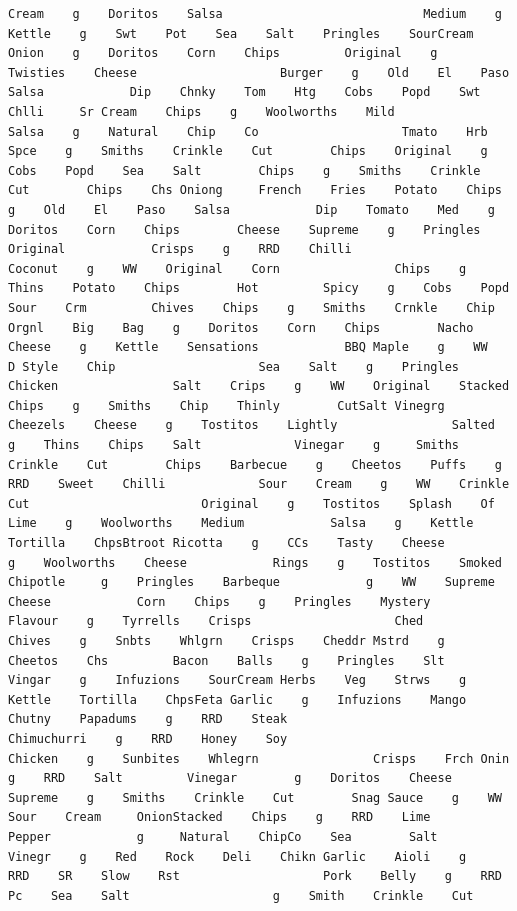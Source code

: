\documentclass[
]{article}
\begin{document}
\begin{verbatim}
Cream    g    Doritos    Salsa                            Medium    g    Kettle    g    Swt    Pot    Sea    Salt    Pringles    SourCream        Onion    g    Doritos    Corn    Chips         Original    g    Twisties    Cheese                    Burger    g    Old    El    Paso    Salsa            Dip    Chnky    Tom    Htg    Cobs    Popd    Swt Chlli     Sr Cream    Chips    g    Woolworths    Mild                    Salsa    g    Natural    Chip    Co                    Tmato    Hrb Spce    g    Smiths    Crinkle    Cut        Chips    Original    g    Cobs    Popd    Sea    Salt        Chips    g    Smiths    Crinkle    Cut        Chips    Chs Oniong     French    Fries    Potato    Chips    g    Old    El    Paso    Salsa            Dip    Tomato    Med    g    Doritos    Corn    Chips        Cheese    Supreme    g    Pringles    Original            Crisps    g    RRD    Chilli                                     Coconut    g    WW    Original    Corn                Chips    g    Thins    Potato    Chips        Hot         Spicy    g    Cobs    Popd    Sour    Crm         Chives    Chips    g    Smiths    Crnkle    Chip         Orgnl    Big    Bag    g    Doritos    Corn    Chips        Nacho    Cheese    g    Kettle    Sensations            BBQ Maple    g    WW    D Style    Chip                    Sea    Salt    g    Pringles    Chicken                Salt    Crips    g    WW    Original    Stacked    Chips    g    Smiths    Chip    Thinly        CutSalt Vinegrg    Cheezels    Cheese    g    Tostitos    Lightly                Salted    g    Thins    Chips    Salt             Vinegar    g     Smiths    Crinkle    Cut        Chips    Barbecue    g    Cheetos    Puffs    g    RRD    Sweet    Chilli             Sour    Cream    g    WW    Crinkle    Cut                        Original    g    Tostitos    Splash    Of        Lime    g    Woolworths    Medium            Salsa    g    Kettle    Tortilla    ChpsBtroot Ricotta    g    CCs    Tasty    Cheese                g    Woolworths    Cheese            Rings    g    Tostitos    Smoked                    Chipotle     g    Pringles    Barbeque            g    WW    Supreme    Cheese            Corn    Chips    g    Pringles    Mystery                Flavour    g    Tyrrells    Crisps                    Ched         Chives    g    Snbts    Whlgrn    Crisps    Cheddr Mstrd    g    Cheetos    Chs         Bacon    Balls    g    Pringles    Slt    Vingar    g    Infuzions    SourCream Herbs    Veg    Strws    g    Kettle    Tortilla    ChpsFeta Garlic    g    Infuzions    Mango                     Chutny    Papadums    g    RRD    Steak                                         Chimuchurri    g    RRD    Honey    Soy                            Chicken    g    Sunbites    Whlegrn                Crisps    Frch Onin    g    RRD    Salt         Vinegar        g    Doritos    Cheese                        Supreme    g    Smiths    Crinkle    Cut        Snag Sauce    g    WW    Sour    Cream     OnionStacked    Chips    g    RRD    Lime         Pepper            g     Natural    ChipCo    Sea        Salt         Vinegr    g    Red    Rock    Deli    Chikn Garlic    Aioli    g    RRD    SR    Slow    Rst                    Pork    Belly    g    RRD    Pc    Sea    Salt                    g    Smith    Crinkle    Cut   
\end{verbatim}
\end{document}
